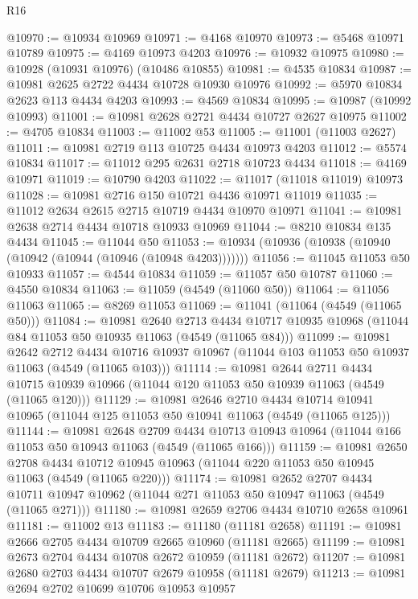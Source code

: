 \begin{lexlean}{R16}
\begin{coremodule}
@10970 := @10934 @10969
@10971 := @4168 @10970
@10973 := @5468 @10971 @10789
@10975 := @4169 @10973 @4203
@10976 := @10932 @10975
@10980 := @10928 (@10931 @10976) (@10486 @10855)
@10981 := @4535 @10834
@10987 := @10981 @2625 @2722 @4434 @10728 @10930 @10976
@10992 := @5970 @10834 @2623 @113 @4434 @4203
@10993 := @4569 @10834
@10995 := @10987 (@10992 @10993)
@11001 := @10981 @2628 @2721 @4434 @10727 @2627 @10975
@11002 := @4705 @10834
@11003 := @11002 @53
@11005 := @11001 (@11003 @2627)
@11011 := @10981 @2719 @113 @10725 @4434 @10973 @4203
@11012 := @5574 @10834
@11017 := @11012 @295 @2631 @2718 @10723 @4434
@11018 := @4169 @10971
@11019 := @10790 @4203
@11022 := @11017 (@11018 @11019) @10973
@11028 := @10981 @2716 @150 @10721 @4436 @10971 @11019
@11035 := @11012 @2634 @2615 @2715 @10719 @4434 @10970 @10971
@11041 := @10981 @2638 @2714 @4434 @10718 @10933 @10969
@11044 := @8210 @10834 @135 @4434
@11045 := @11044 @50
@11053 := @10934 (@10936 (@10938 (@10940 (@10942 (@10944 (@10946 (@10948 @4203)))))))
@11056 := @11045 @11053 @50 @10933
@11057 := @4544 @10834
@11059 := @11057 @50 @10787
@11060 := @4550 @10834
@11063 := @11059 (@4549 (@11060 @50))
@11064 := @11056 @11063
@11065 := @8269 @11053
@11069 := @11041 (@11064 (@4549 (@11065 @50)))
@11084 := @10981
    @2640
    @2713
    @4434
    @10717
    @10935
    @10968
    (@11044 @84 @11053 @50 @10935 @11063 (@4549 (@11065 @84)))
@11099 := @10981
    @2642
    @2712
    @4434
    @10716
    @10937
    @10967
    (@11044 @103 @11053 @50 @10937 @11063 (@4549 (@11065 @103)))
@11114 := @10981
    @2644
    @2711
    @4434
    @10715
    @10939
    @10966
    (@11044 @120 @11053 @50 @10939 @11063 (@4549 (@11065 @120)))
@11129 := @10981
    @2646
    @2710
    @4434
    @10714
    @10941
    @10965
    (@11044 @125 @11053 @50 @10941 @11063 (@4549 (@11065 @125)))
@11144 := @10981
    @2648
    @2709
    @4434
    @10713
    @10943
    @10964
    (@11044 @166 @11053 @50 @10943 @11063 (@4549 (@11065 @166)))
@11159 := @10981
    @2650
    @2708
    @4434
    @10712
    @10945
    @10963
    (@11044 @220 @11053 @50 @10945 @11063 (@4549 (@11065 @220)))
@11174 := @10981
    @2652
    @2707
    @4434
    @10711
    @10947
    @10962
    (@11044 @271 @11053 @50 @10947 @11063 (@4549 (@11065 @271)))
@11180 := @10981 @2659 @2706 @4434 @10710 @2658 @10961
@11181 := @11002 @13
@11183 := @11180 (@11181 @2658)
@11191 := @10981 @2666 @2705 @4434 @10709 @2665 @10960 (@11181 @2665)
@11199 := @10981 @2673 @2704 @4434 @10708 @2672 @10959 (@11181 @2672)
@11207 := @10981 @2680 @2703 @4434 @10707 @2679 @10958 (@11181 @2679)
@11213 := @10981 @2694 @2702 @10699 @10706 @10953 @10957

\end{coremodule}
\end{lexlean}
